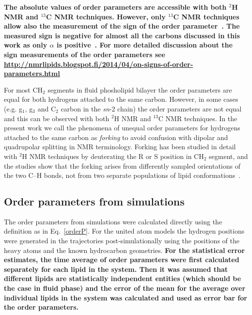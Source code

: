 \documentclass[pre,aps,floatfix,authordate1-4,twocolumn]{revtex4-1}
\begin{document}
{\bf The absolute values of order parameters are accessible with both $^2$H NMR and $^{13}$C NMR techniques. 
However, only $^{13}$C NMR techniques allow also the measurement of the sign of the order parameter~\cite{hong95a,hong95b,gross97}. 
The measured sign is negative for almost all the carbons discussed in this work as only $\alpha$ is positive~\cite{hong95a,hong95b,gross97}. 
For more detailed discussion about the sign measurements of the order parameters see \url{http://nmrlipids.blogspot.fi/2014/04/on-signs-of-order-parameters.html}

For most CH$_2$ segments in fluid phosholipid bilayer the order parameters are equal for both hydrogens attached to the same carbon.
However, in some cases (e.g. g$_1$, g$_3$ and  C$_2$ carbon in the \textit{sn}-2 chain) the order parameters are not equal and this 
can be observed with both $^2$H NMR and $^{13}$C NMR techniques. In the present work we call the phenomena of unequal order parameters 
for hydrogens attached to the same carbon as {\it forking} to avoid confusion with dipolar and quadrupolar splitting in NMR terminology. 
Forking has been studied in detail with $^2$H NMR techniques by deuterating the R or S position in CH$_2$ segment, and
the studies show that the forking arises from differently sampled orientations of the two C--H bonds, not from two 
separate populations of lipid conformations~\cite{engel81,gally81}.
}


\subsection{Order parameters from simulations}
The order parameters from simulations were calculated directly using the definition as in Eq.~\ref{orderP}.
For the united atom models the hydrogen positions were generated 
in the trajectories post-simulationally using the positions of the heavy atoms and the known hydrocarbon geometries.
{\bf For the statistical error estimates, the time average of order parameters were first calculated separately
for each lipid in the system. Then it was assumed that different lipids are statistically independent 
entities (which should be the case in fluid phase) and the error of the mean for the average over individual 
lipids in the system was calculated and used as error bar for the order parameters.}
\end{document}

